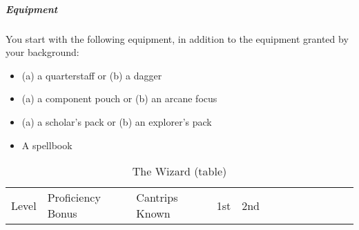 \subparagraph{Equipment}\label{_equipment_4}

You start with the following equipment, in addition to the equipment
granted by your background:

\begin{itemize}
\item
  (a) a quarterstaff or (b) a dagger
\item
  (a) a component pouch or (b) an arcane focus
\item
  (a) a scholar's pack or (b) an explorer's pack
\item
  A spellbook
\end{itemize}

\begin{longtable}[]{@{}
  >{\raggedright\arraybackslash}p{}
  >{\raggedright\arraybackslash}p{}
  >{\raggedright\arraybackslash}p{}
  >{\raggedright\arraybackslash}p{}
  >{\raggedright\arraybackslash}p{}
  >{\raggedright\arraybackslash}p{}
  >{\raggedright\arraybackslash}p{}
  >{\raggedright\arraybackslash}p{}
  >{\raggedright\arraybackslash}p{}
  >{\raggedright\arraybackslash}p{}
  >{\raggedright\arraybackslash}p{}
  >{\raggedright\arraybackslash}p{}
  >{\raggedright\arraybackslash}p{}@{}}
\caption{The Wizard (table)}\label{wizard-table}\tabularnewline
\toprule\noalign{}
\begin{minipage}[b]{\linewidth}\raggedright
Level
\end{minipage} & \begin{minipage}[b]{\linewidth}\raggedright
Proficiency Bonus
\end{minipage} & \begin{minipage}[b]{\linewidth}\centering
Cantrips Known
\end{minipage} & \begin{minipage}[b]{\linewidth}\centering
1st
\end{minipage} & \begin{minipage}[b]{\linewidth}\centering
2nd
\end{minipage} & \begin{minipage}[b]{\linewidth}\centering

\end{minipage}
\end{longtable}
